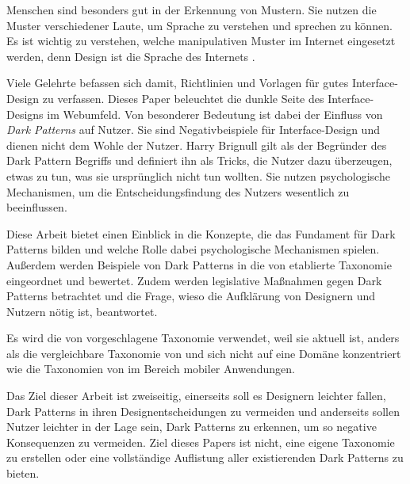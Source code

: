 \documentclass[conference,compsoc,final,a4paper]{IEEEtran}
\begin{document}
Menschen sind besonders gut in der Erkennung von Mustern. Sie nutzen die Muster verschiedener Laute, um Sprache zu verstehen und sprechen zu können. Es ist wichtig zu verstehen, welche manipulativen Muster im Internet eingesetzt werden, denn Design ist die Sprache des Internets \autocite{Nerdwriter1_YT_2018}.

Viele Gelehrte befassen sich damit, Richtlinien und Vorlagen für gutes Interface-Design zu verfassen. Dieses Paper beleuchtet die dunkle Seite des Interface-Designs im Webumfeld. Von besonderer Bedeutung ist dabei der Einfluss von \textit{Dark Patterns} auf Nutzer. Sie sind Negativbeispiele für Interface-Design und dienen nicht dem Wohle der Nutzer. Harry Brignull \autocite{Brignull} gilt als der Begründer des Dark Pattern Begriffs und definiert ihn als Tricks, die Nutzer dazu überzeugen, etwas zu tun, was sie ursprünglich nicht tun wollten. Sie nutzen psychologische Mechanismen, um die Entscheidungsfindung des Nutzers wesentlich zu beeinflussen.

Diese Arbeit bietet einen Einblick in die Konzepte, die das Fundament für Dark Patterns bilden und welche Rolle dabei psychologische Mechanismen spielen. Außerdem werden Beispiele von Dark Patterns in die von \citeauthor{Gray_2018} \autocite{Gray_2018} etablierte Taxonomie eingeordnet und bewertet. Zudem werden legislative Maßnahmen gegen Dark Patterns betrachtet und die Frage, wieso die Aufklärung von Designern und Nutzern nötig ist, beantwortet.

Es wird die von \citeauthor*{Gray_2018} \autocite{Gray_2018} vorgeschlagene Taxonomie verwendet, weil sie aktuell ist, anders als die vergleichbare Taxonomie von \citeauthor{Conti2010} \autocite{Conti2010} und sich nicht auf eine Domäne konzentriert wie die Taxonomien von \citeauthor{Lewis2014} \autocite{Lewis2014} im Bereich mobiler Anwendungen.


Das Ziel dieser Arbeit ist zweiseitig, einerseits soll es Designern leichter fallen, Dark Patterns in ihren Designentscheidungen zu vermeiden und anderseits sollen Nutzer leichter in der Lage sein, Dark Patterns zu erkennen, um so negative Konsequenzen zu vermeiden. Ziel dieses Papers ist nicht, eine eigene Taxonomie zu erstellen oder eine vollständige Auflistung aller existierenden Dark Patterns zu bieten.
\end{document}
